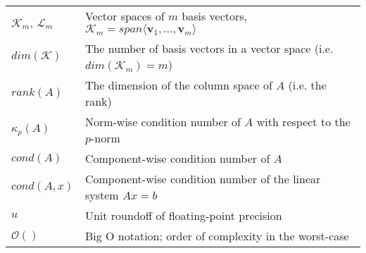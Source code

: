 \begin{tabular}{ll}
  $\mathcal{K}_m$, $\mathcal{L}_m$ & Vector spaces of $m$ basis vectors,  $\mathcal{K}_m=span\langle \bm{v}_1, \dots, \bm{v}_{m} \rangle$ \\
  $dim(\mathcal{K})$ & The number of basis vectors in a vector space (i.e. $dim(\mathcal{K}_m)=m$) \\
  $rank(A)$ & The dimension of the column space of $A$ (i.e. the rank)\\
  $\kappa_{p}(A)$ & Norm-wise condition number of $A$ with respect to the $p$-norm \\
  $cond(A)$ & Component-wise condition number of $A$ \\
  $cond(A, x)$ & Component-wise condition number of the linear system $Ax=b$ \\
  $u$      & Unit roundoff of floating-point precision \\
  $\mathcal{O}()$ & Big O notation; order of complexity in the worst-case\\

\end{tabular}
\vspace{0.5cm}